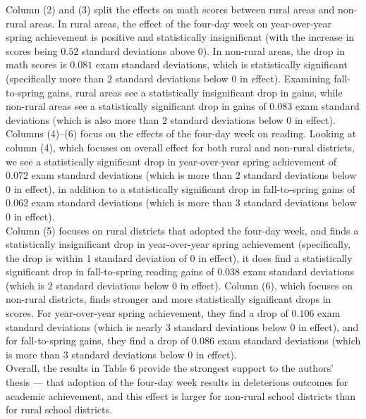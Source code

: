 \documentclass[8pt]{extarticle}
\begin{document}
  Column (2) and (3) split the effects on math scores between rural areas and non-rural areas. In rural areas, the effect of the four-day week on year-over-year spring achievement is positive and statistically insignificant (with the increase in scores being $0.52$ standard deviations above $0$). In non-rural areas, the drop in math scores is $0.081$ exam standard deviations, which is statistically significant (specifically more than $2$ standard deviations below $0$ in effect). Examining fall-to-spring gains, rural areas see a statistically insignificant drop in gains, while non-rural areas see a statistically significant drop in gains of $0.083$ exam standard deviations (which is also more than $2$ standard deviations below $0$ in effect).\\

  Columns (4)--(6) focus on the effects of the four-day week on reading. Looking at column (4), which focuses on overall effect for both rural and non-rural districts, we see a statistically significant drop in year-over-year spring achievement of $0.072$ exam standard deviations (which is more than $2$ standard deviations below $0$ in effect), in addition to a statistically significant drop in fall-to-spring gains of $0.062$ exam standard deviations (which is more than $3$ standard deviations below $0$ in effect).\\

  Column (5) focuses on rural districts that adopted the four-day week, and finds a statistically insignificant drop in year-over-year spring achievement (specifically, the drop is within 1 standard deviation of $0$ in effect), it does find a statistically significant drop in fall-to-spring reading gains of 0.038 exam standard deviations (which is $2$ standard deviations below $0$ in effect). Column (6), which focuses on non-rural districts, finds stronger and more statistically significant drops in scores. For year-over-year spring achievement, they find a drop of $0.106$ exam standard deviations (which is nearly $3$ standard deviations below $0$ in effect), and for fall-to-spring gains, they find a drop of $0.086$ exam standard deviations (which is more than $3$ standard deviations below $0$ in effect).\\

  Overall, the results in Table 6 provide the strongest support to the authors' thesis --- that adoption of the four-day week results in deleterious outcomes for academic achievement, and this effect is larger for non-rural school districts than for rural school districts.
\end{document}
